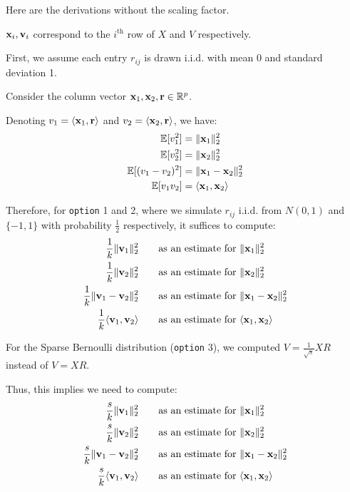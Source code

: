 \documentclass[a4paper,12pt]{article}
\numberwithin{equation}{section}
\begin{document}
 

Here are the derivations without the scaling factor. 

${\bf x}_i, {\bf v}_i$ correspond to the $i^\text{th}$ row of $X$ and $V$ respectively.

First, we assume each entry $r_{ij}$ is drawn i.i.d. with mean 0 and standard deviation 1. 

Consider the column vector ${\bf x}_1, {\bf x}_2, {\bf r} \in \mathbb R^p$. 

Denoting $v_1 = \langle {\bf x}_1, {\bf r}\rangle$ and $v_2 = \langle {\bf x}_2, {\bf r}\rangle$, we have:
\begin{align}
\mathbb E[v_1^2] & = \|{\bf x}_1\|_2^2\\
\mathbb E[v_2^2] & = \|{\bf x}_2\|_2^2 \\
\mathbb E[(v_1-v_2)^2] & = \|{\bf x}_1 - {\bf x}_2\|_2^2 \\
\mathbb E[v_1v_2] & = \langle {\bf x}_1, {\bf x}_2 \rangle
\end{align}

Therefore, for {\tt option} 1 and 2, where we simulate $r_{ij}$ i.i.d. from $N(0,1)$ and $\{-1,1\}$ with probability $\frac{1}{2}$ respectively, it suffices to compute:
\begin{align*}
\frac{1}{k} \|{\bf v}_1\|_2^2 & ~~~~~~\text{as an estimate for $\|{\bf x}_1\|_2^2$} \\
\frac{1}{k} \|{\bf v}_2\|_2^2 & ~~~~~~\text{as an estimate for $\|{\bf x}_2\|_2^2$} \\
\frac{1}{k} \|{\bf v}_1 - {\bf v}_2\|_2^2 & ~~~~~~\text{as an estimate for $\|{\bf x}_1 - {\bf x}_2\|_2^2$} \\
\frac{1}{k} \langle {\bf v}_1, {\bf v}_2 \rangle & ~~~~~~\text{as an estimate for $\langle {\bf x}_1, {\bf x}_2 \rangle$} 
\end{align*}

For the Sparse Bernoulli distribution ({\tt option} 3), we computed $V = \frac{1}{\sqrt{s}}XR$ instead of $V = XR$. 

Thus, this implies we need to compute:
\begin{align*}
\frac{s}{k} \|{\bf v}_1\|_2^2 & ~~~~~~\text{as an estimate for $\|{\bf x}_1\|_2^2$} \\
\frac{s}{k} \|{\bf v}_2\|_2^2 & ~~~~~~\text{as an estimate for $\|{\bf x}_2\|_2^2$} \\
\frac{s}{k} \|{\bf v}_1 - {\bf v}_2\|_2^2 & ~~~~~~\text{as an estimate for $\|{\bf x}_1 - {\bf x}_2\|_2^2$} \\
\frac{s}{k} \langle {\bf v}_1, {\bf v}_2 \rangle & ~~~~~~\text{as an estimate for $\langle {\bf x}_1, {\bf x}_2 \rangle$} 
\end{align*}
\end{document}
